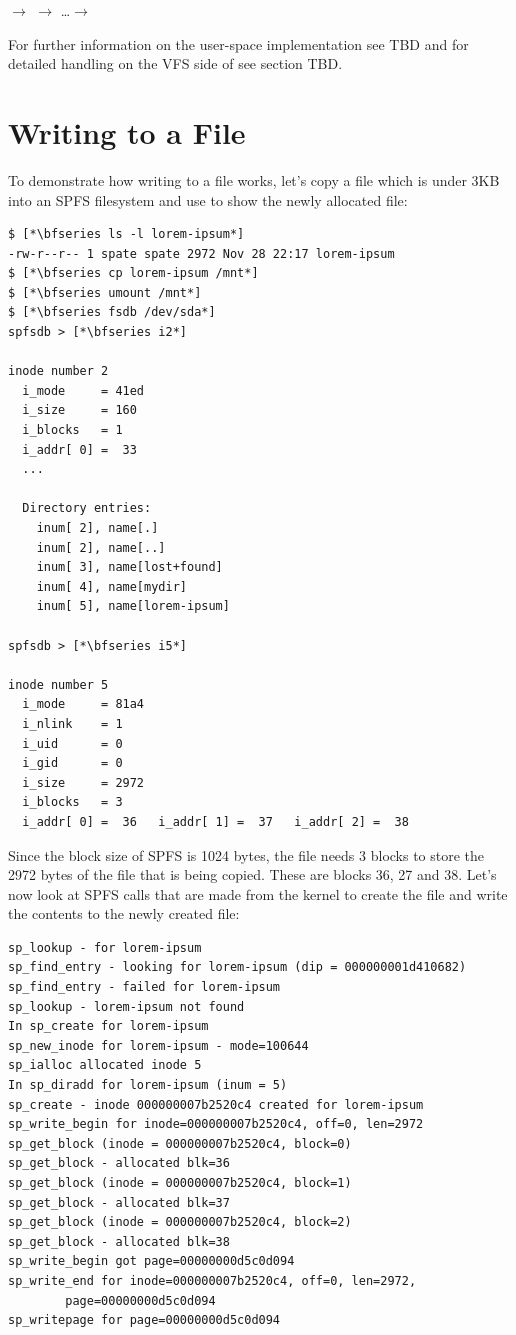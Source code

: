 \small
\bigskip
{} $\rightarrow$   $\rightarrow$ \ldots $\rightarrow$ 

\bigskip
\normalsize
\noindent
For further information on the user-space implementation see TBD and for detailed handling on the VFS side of  see section TBD.


\section{Writing to a File}

To demonstrate how writing to a file works, let's copy a file which is under 3KB into an SPFS filesystem and use  to show the newly allocated file:

\begin{lstlisting}
$ [*\bfseries ls -l lorem-ipsum*]
-rw-r--r-- 1 spate spate 2972 Nov 28 22:17 lorem-ipsum
$ [*\bfseries cp lorem-ipsum /mnt*]
$ [*\bfseries umount /mnt*]
$ [*\bfseries fsdb /dev/sda*]
spfsdb > [*\bfseries i2*]

inode number 2
  i_mode     = 41ed
  i_size     = 160
  i_blocks   = 1
  i_addr[ 0] =  33
  ...

  Directory entries:
	inum[ 2], name[.]
	inum[ 2], name[..]
	inum[ 3], name[lost+found]
	inum[ 4], name[mydir]
	inum[ 5], name[lorem-ipsum]

spfsdb > [*\bfseries i5*]

inode number 5
  i_mode     = 81a4
  i_nlink    = 1
  i_uid      = 0
  i_gid      = 0
  i_size     = 2972
  i_blocks   = 3
  i_addr[ 0] =  36   i_addr[ 1] =  37   i_addr[ 2] =  38
\end{lstlisting}

\noindent
Since the block size of SPFS is 1024 bytes, the file needs 3 blocks to store the 2972 bytes of the file that is being copied. These are blocks 36, 27 and 38. Let's now look at SPFS calls that are made from the kernel to create the file and write the contents to the newly created file:

\begin{lstlisting}
sp_lookup - for lorem-ipsum
sp_find_entry - looking for lorem-ipsum (dip = 000000001d410682)
sp_find_entry - failed for lorem-ipsum
sp_lookup - lorem-ipsum not found
In sp_create for lorem-ipsum
sp_new_inode for lorem-ipsum - mode=100644
sp_ialloc allocated inode 5
In sp_diradd for lorem-ipsum (inum = 5)
sp_create - inode 000000007b2520c4 created for lorem-ipsum
sp_write_begin for inode=000000007b2520c4, off=0, len=2972
sp_get_block (inode = 000000007b2520c4, block=0)
sp_get_block - allocated blk=36 
sp_get_block (inode = 000000007b2520c4, block=1)
sp_get_block - allocated blk=37 
sp_get_block (inode = 000000007b2520c4, block=2)
sp_get_block - allocated blk=38 
sp_write_begin got page=00000000d5c0d094
sp_write_end for inode=000000007b2520c4, off=0, len=2972, 
        page=00000000d5c0d094
sp_writepage for page=00000000d5c0d094
\end{lstlisting}

